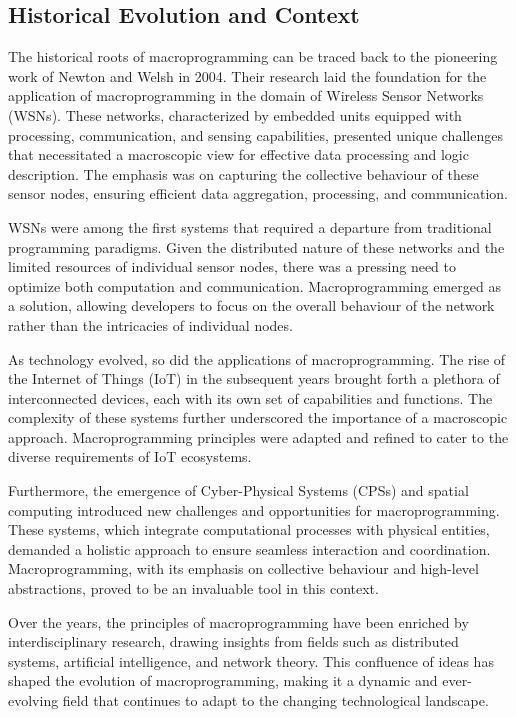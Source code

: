 \subsection{Historical Evolution and Context}

The historical roots of macroprogramming can be traced back to the pioneering work of Newton and Welsh in 2004. 
 Their research laid the foundation for the application of macroprogramming in the domain of Wireless Sensor Networks (WSNs). 
 These networks, characterized by embedded units equipped with processing, communication, and sensing capabilities, presented unique challenges that necessitated a macroscopic view for effective data processing and logic description. 
The emphasis was on capturing the collective behaviour of these sensor nodes, 
 ensuring efficient data aggregation, processing, and communication.

WSNs were among the first systems that required a departure from traditional programming paradigms. 
 Given the distributed nature of these networks and the limited resources of individual sensor nodes, 
 there was a pressing need to optimize both computation and communication. 
 Macroprogramming emerged as a solution, allowing developers to focus on the overall behaviour of the network rather than the intricacies of individual nodes.

As technology evolved, so did the applications of macroprogramming. 
 The rise of the Internet of Things (IoT) in the subsequent years brought forth a plethora of interconnected devices, each with its own set of capabilities and functions. 
 The complexity of these systems further underscored the importance of a macroscopic approach. Macroprogramming principles were adapted and refined to cater to the diverse requirements of IoT ecosystems.

Furthermore, the emergence of Cyber-Physical Systems (CPSs) and spatial computing introduced new challenges and opportunities for macroprogramming. 
 These systems, which integrate computational processes with physical entities, demanded a holistic approach to ensure seamless interaction and coordination. 
 Macroprogramming, with its emphasis on collective behaviour and high-level abstractions, proved to be an invaluable tool in this context.

Over the years, the principles of macroprogramming have been enriched by interdisciplinary research, drawing insights from fields such as distributed systems, artificial intelligence, and network theory. 
 This confluence of ideas has shaped the evolution of macroprogramming, making it a dynamic and ever-evolving field that continues to adapt to the changing technological landscape.

